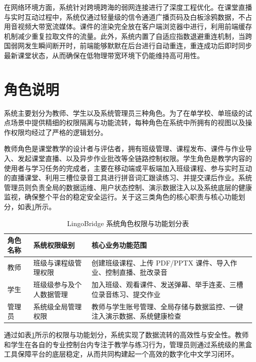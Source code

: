在网络环境方面，系统针对跨境跨海的弱网连接进行了深度工程优化。在课堂直播与实时互动过程中，系统仅通过轻量级的信令通道广播页码及白板涂鸦数据，不占用音视频大带宽流媒体。课件的渲染完全放在客户端浏览器中进行，利用前端缓存机制减少重复拉取文件的流量。此外，系统内置了自适应指数退避重连机制，当跨国弱网发生瞬间断开时，前端能够默默在后台进行自动重连，重连成功后即时同步最新课堂状态，从而确保在低物理带宽环境下仍能维持高可用性。

\section{角色说明}

系统主要划分为教师、学生以及系统管理员三种角色。为了在单学校、单班级的试点场景中提供精细的权限隔离与功能流转，每种角色在系统中所拥有的视图以及操作权限均经过了严格的逻辑划分。

教师角色是课堂教学的设计者与评估者，拥有班级管理、课程发布、课件与作业导入、发起课堂直播、以及异步作业批改等全链路控制权限。学生角色是教学内容的使用者与学习任务的完成者，主要在移动端或平板端加入班级课程、参与实时互动的直播课堂、利用三槽位录音工具进行拼音词汇跟读练习、并提交课后作业。系统管理员则负责全局的数据运维、用户状态控制、演示数据注入以及系统底层的健康监视，确保整个平台的稳定安全运行。关于这三类角色的核心职责与核心功能划分，如表\ref{tab:role_description}所示。

\begin{table}[htbp]
  \centering
  \caption{LingoBridge 系统角色权限与功能划分表}
  \label{tab:role_description}
  \begin{tabularx}{\textwidth}{lXX}
    \toprule
    角色名称 & 系统权限级别 & 核心业务功能范围 \\
    \midrule
    教师 & 班级与课程级管理权限 & 创建班级课程、上传 PDF/PPTX 课件、导入作业、控制直播、批改录音 \\
    学生 & 班级级参与及个人数据管理 & 加入班级、观看课件、发送弹幕、举手连麦、三槽位录音练习、提交作业 \\
    管理员 & 系统级全局管理权限 & 教师与学生账号管理、全局存储与数据监控、一键注入演示数据、系统健康检查 \\
    \bottomrule
  \end{tabularx}
\end{table}

通过如表\ref{tab:role_description}所示的权限与功能划分，系统实现了数据流转的高效性与安全性。教师和学生在各自的专业控制台内专注于教学与练习行为，管理员则通过系统级的黑盒工具保障平台的底层稳定，从而共同构建起一个高效的数字化中文学习闭环。
